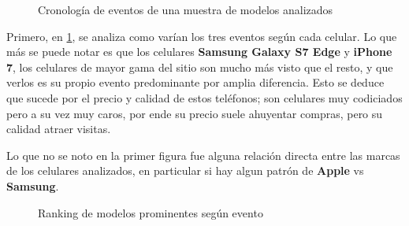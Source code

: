 \documentclass[a4paper]{article}
\begin{document}
\begin{figure}[h!]
	\caption{Cronología de eventos de una muestra de modelos analizados}
	\label{fig:prominentes}
\end{figure}

Primero, en \ref{fig:prominentes}, se analiza como varían los tres eventos según cada celular. Lo que más se puede notar es que los celulares \textbf{Samsung Galaxy S7 Edge} y \textbf{iPhone 7}, los celulares de mayor gama del sitio son mucho más visto que el resto, y que verlos es su propio evento predominante por amplia diferencia. Esto se deduce que sucede por el precio y calidad de estos teléfonos; son celulares muy codiciados pero a su vez muy caros, por ende su precio suele ahuyentar compras, pero su calidad atraer visitas.

Lo que no se noto en la primer figura fue alguna relación directa entre las marcas de los celulares analizados, en particular si hay algun patrón de \textbf{Apple} vs \textbf{Samsung}.

\begin{figure}[h!]
	\caption{Ranking de modelos prominentes según evento}
	\label{fig:prominentesrank}
\end{figure}
\end{document}
